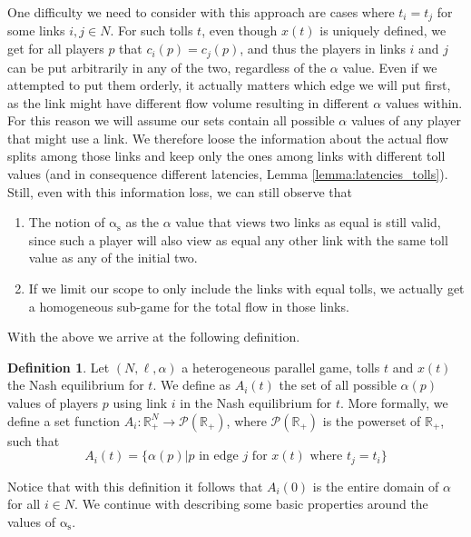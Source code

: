 \documentclass[10pt,a4paper]{book}
\newcommand{\as}{\mathrm{\alpha_s}}
\newcommand{\R}{\mathbb{R}}
\theoremstyle{definition}
\newtheorem{definition}{Definition}[chapter]
\theoremstyle{comment}
\begin{document}
One difficulty we need to consider with this approach are cases where $t_i = t_j$ for some links $i, j \in N$.
For such tolls $t$, even though $x(t)$ is uniquely defined, we get for all players $p$ that $c_i(p) = c_j(p)$, and thus the players in links $i$ and $j$ can be put arbitrarily in any of the two, regardless of the $\alpha$ value.
Even if we attempted to put them orderly, it actually matters which edge we will put first, as the link might have different flow volume resulting in different $\alpha$ values within.
For this reason we will assume our sets contain all possible $\alpha$ values of any player that might use a link.
We therefore loose the information about the actual flow splits among those links and keep only the ones among links with different toll values (and in consequence different latencies, Lemma \ref{lemma:latencies_tolls}).
Still, even with this information loss, we can still observe that
\begin{enumerate}
	\item The notion of $\as$ as the $\alpha$ value that views two links as equal is still valid, since such a player will also view as equal any other link with the same toll value as any of the initial two.
	\item If we limit our scope to only include the links with equal tolls, we actually get a homogeneous sub-game for the total flow in those links.
\end{enumerate}
With the above we arrive at the following definition.

\begin{definition}
	\label{definition:alpha_flow_sets}
	Let $(N, \ell, \alpha)$ a heterogeneous parallel game, tolls $t$ and $x(t)$ the Nash equilibrium for $t$.
	We define as $A_i(t)$ the set of all possible $\alpha(p)$ values of players $p$ using link $i$ in the Nash equilibrium for $t$.
	More formally, we define a set function $A_i: \R_+^N \rightarrow \mathcal{P}(\R_+)$, where $\mathcal{P}(\R_+)$ is the powerset of $\R_+$, such that
	\[A_i(t) = \{\alpha(p)|p \text{ in edge } j \text{ for } x(t) \text{ where } t_j = t_i\}\]
\end{definition}

Notice that with this definition it follows that $A_i(0)$ is the entire domain of $\alpha$ for all $i \in N$.
We continue with describing some basic properties around the values of $\as$.

\end{document}
